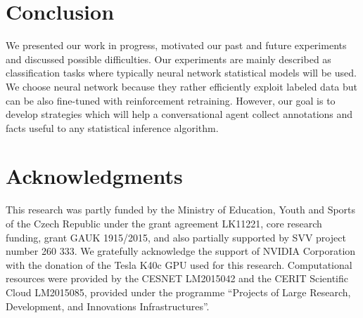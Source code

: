 \documentclass[11pt]{article}
\begin{document}
\section{Conclusion}
\label{sec:conclusion}
We presented our work in progress, motivated our past and future experiments and discussed possible difficulties.
Our experiments are mainly described as classification tasks where typically neural network statistical models will be used.
We choose neural network because they rather efficiently exploit labeled data but can be also fine-tuned with reinforcement retraining.
However, our goal is to develop strategies which will help a conversational agent collect annotations and facts useful to any statistical inference algorithm.

\section*{Acknowledgments}
This research was partly funded by the Ministry of Education, Youth and Sports of the Czech Republic under the grant agreement LK11221, core research funding, grant GAUK 1915/2015, and also partially supported by SVV project number 260 333. 
We gratefully acknowledge the support of NVIDIA Corporation with the donation of the Tesla K40c GPU used for this research.
Computational resources were provided by the CESNET LM2015042 and the CERIT Scientific Cloud LM2015085, provided under the programme ``Projects of Large Research, Development, and Innovations Infrastructures''.



\end{document}
